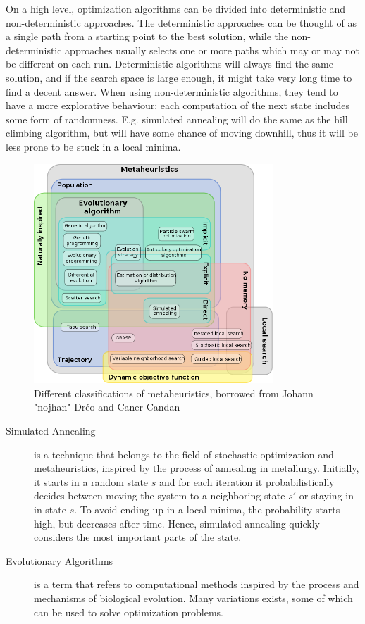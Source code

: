 On a high level, optimization algorithms can be divided into deterministic and
non-deterministic approaches. The deterministic approaches can be thought of as
a single path from a starting point to the best solution, while the
non-deterministic approaches usually selects one or more paths which may or may
not be different on each run. Deterministic algorithms will always find the same
solution, and if the search space is large enough, it might take very long time
to find a decent answer. When using non-deterministic algorithms, they tend to
have a more explorative behaviour; each computation of the next state includes
some form of randomness. E.g. simulated annealing will do the same as the hill
climbing algorithm, but will have some chance of moving downhill, thus it will
be less prone to be stuck in a local minima.

\begin{figure}
    \centering
    \includegraphics[width=0.8\textwidth]{figs/630px-Metaheuristics_classification.png}
    \caption{Different classifications of metaheuristics, borrowed from Johann "nojhan" Dréo and Caner Candan\cite{wikimetaheuristics}}
    \label{fig:metaheuristics}
\end{figure}

\begin{description}
    \item[Simulated Annealing] is a technique that belongs to the field of
        stochastic optimization and metaheuristics, inspired by the process of
        annealing in metallurgy. Initially, it starts in a random state $s$ and
        for each iteration it probabilistically decides between moving the
        system to a neighboring state $s'$ or staying in in state $s$. To avoid
        ending up in a local minima, the probability starts high, but decreases
        after time. Hence, simulated annealing quickly considers the most
        important parts of the state.
    \item[Evolutionary Algorithms] is a term that refers to computational
        methods inspired by the process and mechanisms of biological evolution.
        Many variations exists, some of which can be used to solve optimization
        problems.

\end{description}

